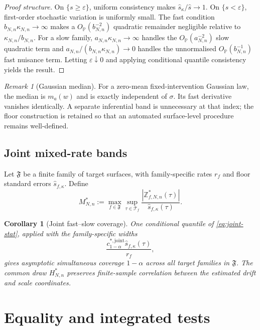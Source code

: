\documentclass[11pt]{article}
\newtheorem{corollary}[assumption]{Corollary}
\theoremstyle{remark}
\newtheorem{remark}[assumption]{Remark}
\newcommand{\Pp}{\mathbb P}
\newcommand{\cT}{\mathcal T}
\newcommand{\abs}[1]{\left\lvert #1\right\rvert}
\newcommand{\an}{a_{N,n}}
\newcommand{\bn}{b_{N,n}}
\begin{document}
\begin{proof}[Proof structure]
On $\{s\ge\varepsilon\}$, uniform consistency makes $\widehat s_\kappa/\widehat s\to1$. On $\{s<\varepsilon\}$, first-order stochastic variation is uniformly small. The fast condition $\bn\kappa_{N,n}\to\infty$ makes a $O_{\Pp}(\bn^{-2})$ quadratic remainder negligible relative to $\kappa_{N,n}/\bn$. For a slow family, $\an\kappa_{N,n}\to\infty$ handles the $O_{\Pp}(\an^{-2})$ slow quadratic term and $\an/(\bn\kappa_{N,n})\to0$ handles the unnormalised $O_{\Pp}(\bn^{-1})$ fast nuisance term. Letting $\varepsilon\downarrow0$ and applying conditional quantile consistency yields the result.
\end{proof}

\begin{remark}[Gaussian median]
For a zero-mean fixed-intervention Gaussian law, the median is $m_a(w)$ and is exactly independent of $\sigma$. Its fast derivative vanishes identically. A separate inferential band is unnecessary at that index; the floor construction is retained so that an automated surface-level procedure remains well-defined.
\end{remark}

\subsection{Joint mixed-rate bands}

Let $\mathfrak F$ be a finite family of target surfaces, with family-specific rates $r_f$ and floor standard errors $\widehat s_{f,\kappa}$. Define
\begin{equation}\label{eq:joint-stat}
 M_{N,n}^*
 :=
 \max_{f\in\mathfrak F}
 \sup_{\tau\in\cT_f}
 \frac{\abs{\mathbb Z_{f,N,n}^*(\tau)}}
 {\widehat s_{f,\kappa}(\tau)}.
\end{equation}

\begin{corollary}[Joint fast--slow coverage]\label{cor:joint}
One conditional quantile of \eqref{eq:joint-stat}, applied with the family-specific widths
\[
 \frac{c_{1-\alpha}^{*,\mathrm{joint}}
 \widehat s_{f,\kappa}(\tau)}{r_f},
\]
gives asymptotic simultaneous coverage $1-\alpha$ across all target families in $\mathfrak F$. The common draw $H_{N,n}^*$ preserves finite-sample correlation between the estimated drift and scale coordinates.
\end{corollary}

\section{Equality and integrated tests}
\end{document}
